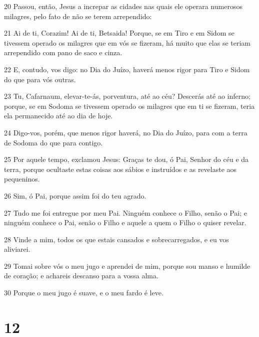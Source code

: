 \par 20 Passou, então, Jesus a increpar as cidades nas quais ele operara numerosos milagres, pelo fato de não se terem arrependido:
\par 21 Ai de ti, Corazim! Ai de ti, Betsaida! Porque, se em Tiro e em Sidom se tivessem operado os milagres que em vós se fizeram, há muito que elas se teriam arrependido com pano de saco e cinza.
\par 22 E, contudo, vos digo: no Dia do Juízo, haverá menos rigor para Tiro e Sidom do que para vós outras.
\par 23 Tu, Cafarnaum, elevar-te-ás, porventura, até ao céu? Descerás até ao inferno; porque, se em Sodoma se tivessem operado os milagres que em ti se fizeram, teria ela permanecido até ao dia de hoje.
\par 24 Digo-vos, porém, que menos rigor haverá, no Dia do Juízo, para com a terra de Sodoma do que para contigo.
\par 25 Por aquele tempo, exclamou Jesus: Graças te dou, ó Pai, Senhor do céu e da terra, porque ocultaste estas coisas aos sábios e instruídos e as revelaste aos pequeninos.
\par 26 Sim, ó Pai, porque assim foi do teu agrado.
\par 27 Tudo me foi entregue por meu Pai. Ninguém conhece o Filho, senão o Pai; e ninguém conhece o Pai, senão o Filho e aquele a quem o Filho o quiser revelar.
\par 28 Vinde a mim, todos os que estais cansados e sobrecarregados, e eu vos aliviarei.
\par 29 Tomai sobre vós o meu jugo e aprendei de mim, porque sou manso e humilde de coração; e achareis descanso para a vossa alma.
\par 30 Porque o meu jugo é suave, e o meu fardo é leve.

\chapter{12}

